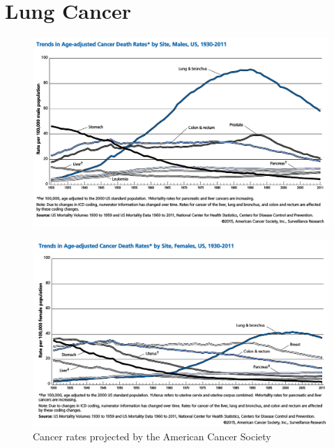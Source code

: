 \section*{Lung Cancer}

\begin{figure}
  \vspace*{\fill}
  \centering
  \includegraphics[width=\textwidth]{./figures/supplementary/acsMenLungCancer.png}
  \label{fig:acsMen}\par\vfill
  \includegraphics[width=\textwidth]{./figures/supplementary/acsWomenLungCancer.png}
  \caption{Cancer rates projected by the American Cancer Society\cite{acs2015}}
  \label{fig:acsWomen}
\end{figure}

